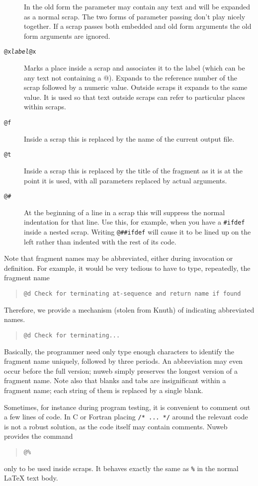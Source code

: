 \documentclass[a4paper]{report}
\begin{document}
\begin{description}
      In the old form the parameter may contain any text and will be
      expanded as a normal scrap. The two forms of parameter passing
      don't play nicely together. If a scrap passes both embedded and
      old form arguments the old form arguments are ignored.
\item[\tt @x{\em label}@x] Marks a place inside a scrap and
associates it to the label (which can be any text not containing
a @). Expands to the reference number of the scrap followed by a
numeric value. Outside scraps it expands to the same value. It is
used so that text outside scraps can refer to particular places
within scraps.
\item[\tt @f] Inside a scrap this is replaced by the name of the
current output file.
\item[\tt @t] Inside a scrap this is replaced by the title of the
fragment as it is at the point it is used, with all parameters
replaced by actual arguments.
\item[\tt @\#] At the beginning of a line in a scrap this will
suppress the normal indentation for that line. Use this, for
example, when you have a \verb|#ifdef| inside a nested scrap.
Writing \verb|@##ifdef| will cause it to be lined up on the left
rather than indented with the rest of its code.
\end{description}
Note that fragment names may be abbreviated, either during invocation or
definition. For example, it would be very tedious to have to
type, repeatedly, the fragment name
\begin{quote}
\verb|@d Check for terminating at-sequence and return name if found|
\end{quote}
Therefore, we provide a mechanism (stolen from Knuth) of indicating
abbreviated names.
\begin{quote}
\verb|@d Check for terminating...|
\end{quote}
Basically, the programmer need only type enough characters to
identify the fragment name uniquely, followed by three periods. An abbreviation
may even occur before the full version; nuweb simply preserves the
longest version of a fragment name. Note also that blanks and tabs are
insignificant within a fragment name; each string of them is replaced by a
single blank.

Sometimes, for instance during program testing, it is convenient to comment
out a few lines of code. In C or Fortran placing \verb|/* ... */| around the relevant
code is not a robust solution, as the code itself may contain
comments. Nuweb provides the command
\begin{quote}
\verb|@%|
\end{quote}only to be used inside scraps. It behaves exactly the same
as \verb|%| in the normal {\LaTeX} text body.
\end{document}
